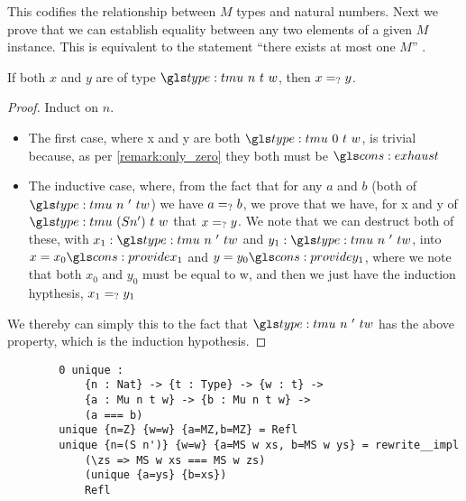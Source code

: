 This codifies the relationship between $M$ types and natural numbers.
Next we prove that we can establish equality between any two elements of a given $M$ instance.
This is equivalent to the statement ``there exists at most one $M$'' \needcite.

\begin{lemma}
	\label{lem:all_eq}
	If both $x$ and $y$ are of type $\tm n t w$, then $x =_? y$.
\end{lemma}
\begin{proof}
	Induct on $n$.
	\begin{itemize}
		\item The first case, where \sigil x and \sigil y are both $\tm 0 t w$, is trivial because, as per \ref{remark:only_zero} they both must be $\mz$
		\item The inductive case, where, from the fact that for any $a$ and $b$ (both of $\tm n' t w$) we have $a =_? b$, we prove that we have, for \sigil x and \sigil y of $\tm {(S n')} t w$ that $x =_? y$.
		We note that we can destruct both of these, with $x_1 : \tm n' t w$ and $y_1 : \tm n' t w$, into $x = x_0 \ms x_1$ and $y = y_0 \ms y_1$, where we note that both $x_0$ and $y_0$ must be equal to \sigil w, and then we just have the induction hypthesis, $x_1 =_? y_1$
	\end{itemize}
	
	We thereby can simply this to the fact that $\tm n' t w$ has the above property, which is the induction hypothesis.
\end{proof}

\begin{listing}
	\begin{verbatim}
		0 unique : 
			{n : Nat} -> {t : Type} -> {w : t} -> 
			{a : Mu n t w} -> {b : Mu n t w} -> 
			(a === b)
		unique {n=Z} {w=w} {a=MZ,b=MZ} = Refl 
		unique {n=(S n')} {w=w} {a=MS w xs, b=MS w ys} = rewrite__impl 
			(\zs => MS w xs === MS w zs)
			(unique {a=ys} {b=xs})
			Refl
	
	\end{verbatim}
	\caption{Proof of \ref{lem:all_eq} in Idris}
	\label{lst:all_eq}
\end{listing}


